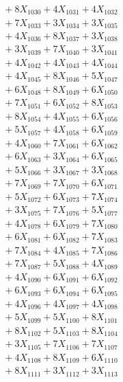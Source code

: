 \documentclass[a4paper,10pt]{article}
\begin{document}
{\begin{align}
&\;  + 8 X_{1030} + 4 X_{1031} + 4 X_{1032} \\[0.3ex]
&\;  + 7 X_{1033} + 3 X_{1034} + 3 X_{1035} \\[0.3ex]
&\;  + 4 X_{1036} + 8 X_{1037} + 3 X_{1038} \\[0.3ex]
&\;  + 3 X_{1039} + 7 X_{1040} + 3 X_{1041} \\[0.3ex]
&\;  + 4 X_{1042} + 4 X_{1043} + 4 X_{1044} \\[0.3ex]
&\;  + 4 X_{1045} + 8 X_{1046} + 5 X_{1047} \\[0.3ex]
&\;  + 6 X_{1048} + 8 X_{1049} + 6 X_{1050} \\[0.3ex]
&\;  + 7 X_{1051} + 6 X_{1052} + 8 X_{1053} \\[0.3ex]
&\;  + 8 X_{1054} + 4 X_{1055} + 6 X_{1056} \\[0.3ex]
&\;  + 5 X_{1057} + 4 X_{1058} + 6 X_{1059} \\[0.5ex]\allowbreak
&\;  + 4 X_{1060} + 7 X_{1061} + 6 X_{1062} \\[0.3ex]
&\;  + 6 X_{1063} + 3 X_{1064} + 6 X_{1065} \\[0.3ex]
&\;  + 5 X_{1066} + 3 X_{1067} + 3 X_{1068} \\[0.3ex]
&\;  + 7 X_{1069} + 7 X_{1070} + 6 X_{1071} \\[0.3ex]
&\;  + 5 X_{1072} + 6 X_{1073} + 7 X_{1074} \\[0.3ex]
&\;  + 3 X_{1075} + 7 X_{1076} + 5 X_{1077} \\[0.3ex]
&\;  + 4 X_{1078} + 6 X_{1079} + 7 X_{1080} \\[0.3ex]
&\;  + 6 X_{1081} + 6 X_{1082} + 7 X_{1083} \\[0.3ex]
&\;  + 7 X_{1084} + 4 X_{1085} + 7 X_{1086} \\[0.3ex]
&\;  + 7 X_{1087} + 5 X_{1088} + 4 X_{1089} \\[0.5ex]\allowbreak
&\;  + 4 X_{1090} + 6 X_{1091} + 6 X_{1092} \\[0.3ex]
&\;  + 6 X_{1093} + 6 X_{1094} + 6 X_{1095} \\[0.3ex]
&\;  + 4 X_{1096} + 4 X_{1097} + 4 X_{1098} \\[0.3ex]
&\;  + 5 X_{1099} + 5 X_{1100} + 8 X_{1101} \\[0.3ex]
&\;  + 8 X_{1102} + 5 X_{1103} + 8 X_{1104} \\[0.3ex]
&\;  + 3 X_{1105} + 7 X_{1106} + 7 X_{1107} \\[0.3ex]
&\;  + 4 X_{1108} + 8 X_{1109} + 6 X_{1110} \\[0.3ex]
&\;  + 8 X_{1111} + 3 X_{1112} + 3 X_{1113} \\[0.3ex]

\end{align}}
\end{document}
